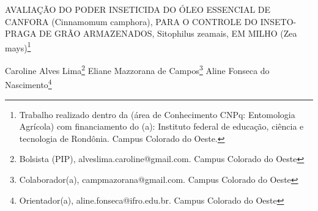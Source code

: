 \documentclass[article,12pt,onesidea,4paper,english,brazil]{abntex2}
\begin{document}
	
	
	\frenchspacing 
	
	\begin{center}
		\LARGE AVALIAÇÃO DO PODER INSETICIDA DO ÓLEO ESSENCIAL DE CANFORA (Cinnamomum camphora), PARA O CONTROLE DO INSETO-PRAGA DE GRÃO ARMAZENADOS, Sitophilus zeamais, EM MILHO (Zea mays)\footnote{Trabalho realizado dentro da (área de Conhecimento CNPq: Entomologia Agrícola) com
			financiamento do (a): Instituto federal de educação, ciência e tecnologia de Rondônia. Campus
			Colorado do Oeste.}
		
		\normalsize
		Caroline Alves Lima\footnote{Bolsista (PIP), alveslima.caroline@gmail.com. Campus Colorado do Oeste} 
		Eliane Mazzorana de Campos\footnote{Colaborador(a), campmazorana@gmail.com. Campus Colorado do Oeste} 
		Aline Fonseca do Nascimento\footnote{Orientador(a), aline.fonseca@ifro.edu.br. Campus Colorado do Oeste} 
		
	\end{center}
	 
\end{document}
